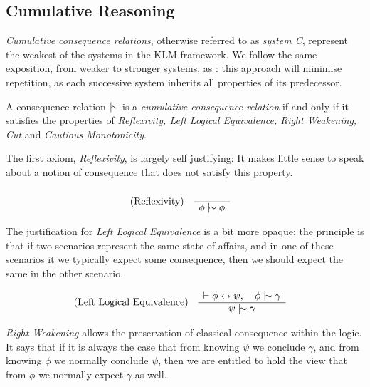 \subsection{Cumulative Reasoning}
\label{subsection:system-c} 

\textit{Cumulative consequence relations}, otherwise referred to as \textit{system C}, represent the weakest of the systems
in the KLM framework. We follow the same exposition, from weaker to stronger systems, as \cite{kraus1990nonmonotonic}: this
approach will minimise repetition, as each successive system inherits all properties of its predecessor.

\begin{definition}
	\label{definition:cumulative-consequence-relation} 

	A consequence relation $\twiddle$ is a \emph{cumulative consequence relation} if and only if it satisfies the properties
	of \emph{Reflexivity, Left Logical Equivalence, Right Weakening, Cut} and \emph{Cautious Monotonicity}.
\end{definition}

The first axiom, \textit{Reflexivity}, is largely self justifying: It makes little sense to speak about a notion of consequence
that does not satisfy this property.

\begin{align}
	\label{postulate:ref}\inferLeft{Reflexivity}{}{\phi \twiddle \phi}
\end{align}

The justification for \textit{Left Logical Equivalence} is a bit more opaque; the principle is that if two scenarios
represent the same state of affairs, and in one of these scenarios it we typically expect some consequence, then we
should expect the same in the other scenario.

\begin{align}
	\label{postulate:lle}\inferLeft{Left Logical Equivalence}{\vdash \phi \leftrightarrow \psi, \quad \phi \twiddle \gamma}{\psi \twiddle \gamma}
\end{align}

\textit{Right Weakening} allows the preservation of classical consequence within the logic. It says that if it is always
the case that from knowing $\psi$ we conclude $\gamma$, and from knowing $\phi$ we normally conclude $\psi$, then we are
entitled to hold the view that from $\phi$ we normally expect $\gamma$ as well.

